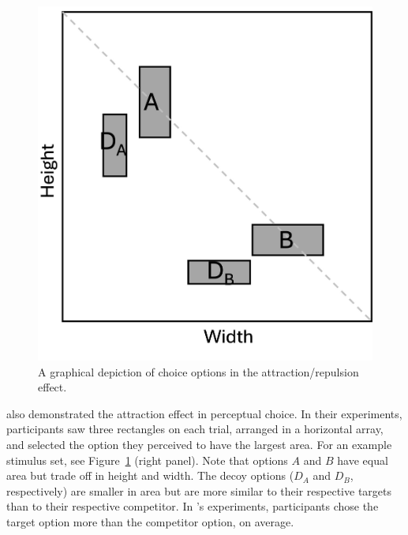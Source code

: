 \begin{figure}
   \includegraphics[width=\linewidth]{figures/percep.jpg}
   \caption{A graphical depiction of choice options in the attraction/repulsion effect.}
   \label{fig:fig_opts}
\end{figure}

\textcite{trueblood2013not} also demonstrated the attraction effect in perceptual choice. In their experiments, participants saw three rectangles on each trial, arranged in a horizontal array, and selected the option they perceived to have the largest area. For an example stimulus set, see Figure~\ref{fig:fig_opts} (right panel). Note that options $A$ and $B$ have equal area but trade off in height and width. The decoy options ($D_{A}$ and $D_{B}$, respectively) are smaller in area but are more similar to their respective targets than to their respective competitor. In \textcite{trueblood2013not}'s experiments, participants chose the target option more than the competitor option, on average. 

